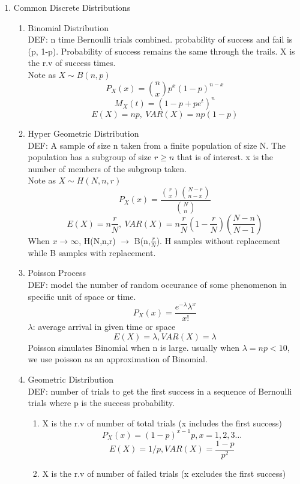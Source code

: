 \documentclass[10pt]{article}
\begin{document}
\begin{multicols}{2}
\begin{enumerate}
			\item Common Discrete Distributions
			\begin{enumerate}
				\item Binomial Distribution\\
				DEF: n time Bernoulli trials combined. probability of success and fail is (p, 1-p). Probability of success remains the same through the trails. X is the r.v of success times.\\
				Note as $X \sim B(n,p)$\\
				$$P_X(x) = {n \choose x} p^x (1-p)^{n-x}$$
				$$M_X(t) = (1-p+pe^t)^n$$
				$$E(X) = np, \ VAR(X) = np(1-p)$$
				\item Hyper Geometric Distribution\\
				DEF: A sample of size n taken from a finite population of size N. The population has a subgroup of size $r \ge n$ that is of interest. x is the number of members of the subgroup taken.\\
				Note as $X \sim H(N,n,r)$\\
				$$P_X(x) = \frac{{r \choose x}{N-r \choose n-x}}{{N \choose n}}$$
				$$E(X) = n\frac{r}{N}, \ VAR(X) = n\frac{r}{N}(1-\frac{r}{N})(\frac{N-n}{N-1})$$
				When $x \rightarrow \infty$, H(N,n,r) $\rightarrow$ B(n,$\frac{r}{N}$). H samples without replacement while B samples with replacement.
				\item Poisson Process\\
				DEF: model the number of random occurance of some phenomenon in specific unit of space or time.\\
				$$P_X(x) = \frac{e^{-\lambda}\lambda^x}{x!}$$
				$\lambda$: average arrival in given time or space\\
				$$E(X) = \lambda, VAR(X) = \lambda$$
				Poisson simulates Binomial when n is large. usually when $\lambda = np < 10$, we use poisson as an approximation of Binomial.
				\item Geometric Distribution\\
				DEF: number of trials to get the first success in a sequence of Bernoulli trials where p is the success probability.
				\begin{enumerate}
					\item X is the r.v of number of total trials (x includes the first success)\\
					$$P_X(x) = (1-p)^{x-1}p, x = 1,2,3 \dots$$
					$$E(X) = 1/p, VAR(X) = \frac{1-p}{p^2}$$
					\item X is the r.v of number of failed trials (x excludes the first success)\\

\end{enumerate}
\end{enumerate}
\end{enumerate}
\end{multicols}
\end{document}
